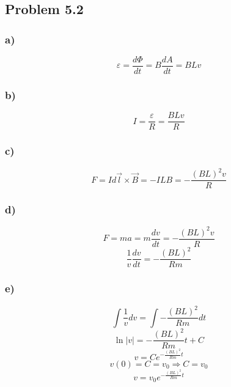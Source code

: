 \documentclass[../homework.tex]{subfiles}
\begin{document}
\subsection{Problem 5.2}
\subsubsection*{a)}
\begin{equation*}
    \varepsilon = \frac{d\Phi}{dt} = B \frac{dA}{dt}
    = B L v
\end{equation*}
\subsubsection*{b)}
\begin{equation*}
    I = \frac{\varepsilon}{R} = \frac{BLv}{R}
\end{equation*}

\subsubsection*{c)}
\begin{equation*}
    F = I d\vec{l} \times \vec{B} = -ILB = -\frac{(BL)^2v}{R}
\end{equation*}

\subsubsection*{d)}
\begin{equation*}
    F = ma = m \frac{dv}{dt} = -\frac{(BL)^2v}{R}
\end{equation*}
\begin{equation*}
    \frac{1}{v}\frac{dv}{dt} = -\frac{(BL)^2}{Rm}
\end{equation*}

\subsubsection*{e)}
\begin{equation*}
    \int \frac{1}{v} dv = \int -\frac{(BL)^2}{Rm} dt
\end{equation*}
\begin{equation*}
    \ln|v| = -\frac{(BL)^2}{Rm} t + C
\end{equation*}
\begin{equation*}
    v = Ce^{-\frac{(BL)^2}{Rm}t}
\end{equation*}
\begin{equation*}
    v(0) = C = v_0 \Rightarrow C = v_0
\end{equation*}
\begin{equation*}
    v = v_0 e^{-\frac{(BL)^2}{Rm}t}
\end{equation*}
\end{document}
